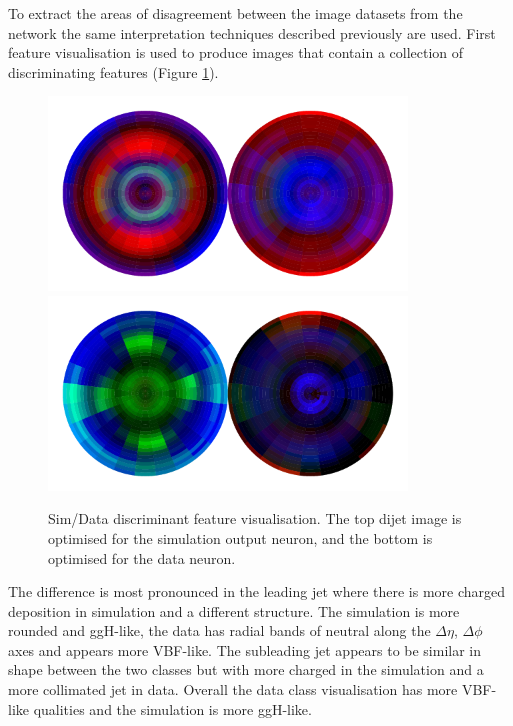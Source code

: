 To extract the areas of disagreement between the image datasets from the network the same interpretation techniques described previously are used. 
First feature visualisation is used to produce images that contain a collection of discriminating features (Figure \ref{fig:event_categorisation:zee_data_sim_feature_vis}).
\begin{figure}[h!]
    \begin{center}
        \includegraphics[width=0.85\textwidth]{figures/event_selection/zee_norm_logits0.pdf}
        \includegraphics[width=0.85\textwidth]{figures/event_selection/zee_norm_logits1.pdf}
    \end{center}
    \caption{Sim/Data discriminant feature visualisation. The top dijet image is optimised for the simulation output neuron, and the bottom is optimised for the data neuron.} 
    \label{fig:event_categorisation:zee_data_sim_feature_vis}
\end{figure}

The difference is most pronounced in the leading jet where there is more charged \pt deposition in simulation and a different structure. The simulation is more rounded and ggH-like, the data has radial bands of neutral \pt along the $\Delta\eta$, $\Delta\phi$ axes and appears more VBF-like.   
The subleading jet appears to be similar in shape between the two classes but with more charged \pt in the simulation and a more collimated jet in data. Overall the data class visualisation has more VBF-like qualities and the simulation is more ggH-like. 

